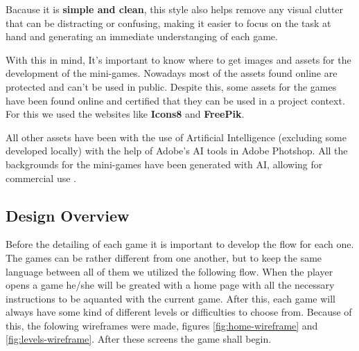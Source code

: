 Bacause it is \textbf{simple and clean}, this style also helps remove any visual clutter that can be distracting or confusing, making it easier to focus on the task at hand and generating an immediate understanging of each game.

With this in mind, It's important to know where to get images and assets for the development of the mini-games. Nowadays most of the assets found online are protected and can't be used in public. Despite this, some assets for the games have been found online and certified that they can be used in a project context. For this we used the websites like \textbf{Icons8} and \textbf{FreePik}.

All other assets have been with the use of Artificial Intelligence (excluding some developed locally) with the help of Adobe's AI tools in Adobe Photshop. All the backgrounds for the mini-games have been generated with AI, allowing for commercial use \cite{adobeGuidelines}.

\subsection*{Design Overview}

Before the detailing of each game it is important to develop the flow for each one. The games can be rather different from one another, but to keep the same language between all of them we utilized the following flow. When the player opens a game he/she will be greated with a home page with all the necessary instructions to be aquanted with the current game. After this, each game will always have some kind of different levels or difficulties to choose from.
Because of this, the folowing wireframes were made, figures \ref{fig:home-wireframe} and \ref{fig:levels-wireframe}. After these screens the game shall begin.

